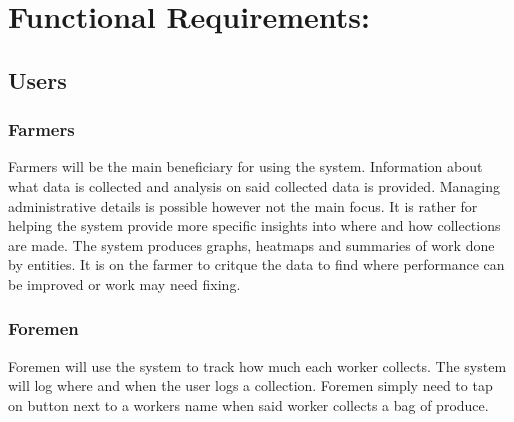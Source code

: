 \documentclass[11pt]{article}
\begin{document}
\section{Functional Requirements:}
\subsection{Users}
\subsubsection{Farmers}
Farmers will be the main beneficiary for using the system. Information about what data is collected and analysis on said collected data is provided. Managing administrative details is possible however not the main focus. It is rather for helping the system provide more specific insights into where and how collections are made. The system produces graphs, heatmaps and summaries of work done by entities. It is on the farmer to critque the data to find where performance can be improved or work may need fixing.

\subsubsection{Foremen}
Foremen will use the system to track how much each worker collects. The system will log where and when the user logs a collection. Foremen simply need to tap on button next to a workers name when said worker collects a bag of produce.
\end{document}
